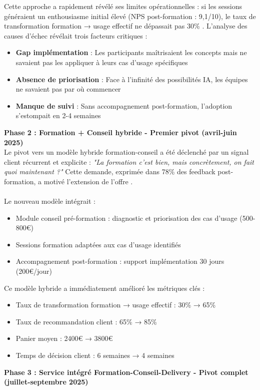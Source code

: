 Cette approche a rapidement révélé ses limites opérationnelles : si les sessions généraient un enthousiasme initial élevé (NPS post-formation : 9,1/10), le taux de transformation formation → usage effectif ne dépassait pas 30\% \cite{luwai2025metrics}. L'analyse des causes d'échec révélait trois facteurs critiques :
\begin{itemize}
    \item \textbf{Gap implémentation} : Les participants maîtrisaient les concepts mais ne savaient pas les appliquer à leurs cas d'usage spécifiques
    \item \textbf{Absence de priorisation} : Face à l'infinité des possibilités IA, les équipes ne savaient pas par où commencer
    \item \textbf{Manque de suivi} : Sans accompagnement post-formation, l'adoption s'estompait en 2-4 semaines
\end{itemize}
\medskip
\textbf{Phase 2 : Formation + Conseil hybride - Premier pivot (avril-juin 2025)}\\
Le pivot vers un modèle hybride formation-conseil a été déclenché par un signal client récurrent et explicite : \emph{"La formation c'est bien, mais concrètement, on fait quoi maintenant ?"} Cette demande, exprimée dans 78\% des feedback post-formation, a motivé l'extension de l'offre \cite{luwai2025feedback}.
\\\\
Le nouveau modèle intégrait :
\begin{itemize}
    \item Module conseil pré-formation : diagnostic et priorisation des cas d'usage (500-800€)
    \item Sessions formation adaptées aux cas d'usage identifiés
    \item Accompagnement post-formation : support implémentation 30 jours (200€/jour)
\end{itemize}
\medskip
Ce modèle hybride a immédiatement amélioré les métriques clés :
\begin{itemize}
    \item Taux de transformation formation → usage effectif : 30\% → 65\%
    \item Taux de recommandation client : 65\% → 85\%
    \item Panier moyen : 2400€ → 3800€
    \item Temps de décision client : 6 semaines → 4 semaines
\end{itemize}
\medskip
\textbf{Phase 3 : Service intégré Formation-Conseil-Delivery - Pivot complet (juillet-septembre 2025)}\\
